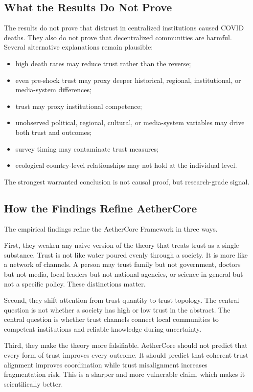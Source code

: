 \documentclass[12pt]{article}
\begin{document}
\subsection{What the Results Do Not Prove}

The results do not prove that distrust in centralized institutions caused COVID deaths. They also do not prove that decentralized communities are harmful. Several alternative explanations remain plausible:

\begin{itemize}
  \item high death rates may reduce trust rather than the reverse;
  \item even pre-shock trust may proxy deeper historical, regional, institutional, or media-system differences;
  \item trust may proxy institutional competence;
  \item unobserved political, regional, cultural, or media-system variables may drive both trust and outcomes;
  \item survey timing may contaminate trust measures;
  \item ecological country-level relationships may not hold at the individual level.
\end{itemize}

The strongest warranted conclusion is not causal proof, but research-grade signal.

\subsection{How the Findings Refine AetherCore}

The empirical findings refine the AetherCore Framework in three ways.

First, they weaken any naive version of the theory that treats trust as a single substance. Trust is not like water poured evenly through a society. It is more like a network of channels. A person may trust family but not government, doctors but not media, local leaders but not national agencies, or science in general but not a specific policy. These distinctions matter.

Second, they shift attention from trust quantity to trust topology. The central question is not whether a society has high or low trust in the abstract. The central question is whether trust channels connect local communities to competent institutions and reliable knowledge during uncertainty.

Third, they make the theory more falsifiable. AetherCore should not predict that every form of trust improves every outcome. It should predict that coherent trust alignment improves coordination while trust misalignment increases fragmentation risk. This is a sharper and more vulnerable claim, which makes it scientifically better.
\end{document}
